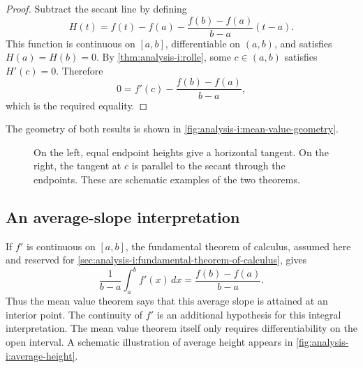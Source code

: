 \begin{proof}
  Subtract the secant line by defining
  \[
    H(t)=f(t)-f(a)-\frac{f(b)-f(a)}{b-a}(t-a).
  \]
  This function is continuous on $[a,b]$, differentiable on $(a,b)$,
  and satisfies $H(a)=H(b)=0$. By \autoref{thm:analysis-i:rolle}, some
  $c\in(a,b)$ satisfies $H'(c)=0$. Therefore
  \[
    0=f'(c)-\frac{f(b)-f(a)}{b-a},
  \]
  which is the required equality.
\end{proof}
The geometry of both results is shown in
\autoref{fig:analysis-i:mean-value-geometry}.
\begin{figure}
  \centering
  
  \caption[Rolle and mean-value geometry.]{On the
    left, equal endpoint heights give a horizontal tangent. On the right,
    the tangent at $c$ is parallel to the secant through the endpoints.
    These are schematic examples of the two theorems.}
  \label{fig:analysis-i:mean-value-geometry}
\end{figure}

\subsection{An average-slope interpretation}
If $f'$ is continuous on $[a,b]$, the fundamental theorem of calculus,
assumed here and reserved for
\autoref{sec:analysis-i:fundamental-theorem-of-calculus}, gives
\[
  \frac1{b-a}\int_a^b f'(x)\,dx=\frac{f(b)-f(a)}{b-a}.
\]
Thus the mean value theorem says that this average slope is attained
at an interior point. The continuity of $f'$ is an additional hypothesis
for this integral interpretation. The mean value theorem itself only
requires differentiability on the open interval. A schematic illustration
of average height appears in
\autoref{fig:analysis-i:average-height}.
\begin{marginfigure}
  \centering
  
  \caption[Average height of a continuous graph.]{A
    schematic continuous function $\phi$ and its average height
    $\overline\phi=(b-a)^{-1}\int_a^b\phi(x)\,dx$ (dashed).}
  \label{fig:analysis-i:average-height}
\end{marginfigure}

